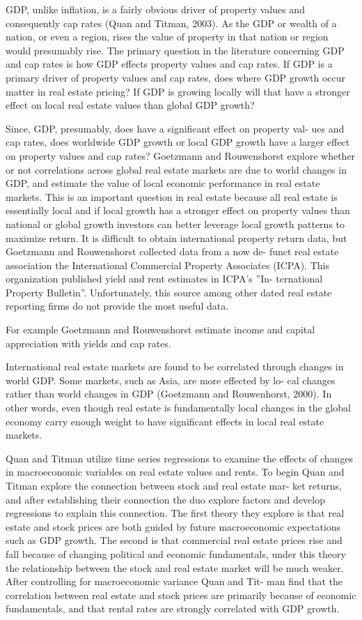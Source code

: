 GDP, unlike inflation, is a fairly obvious driver of property values and consequently cap rates (Quan and Titman, 2003). As the GDP or wealth of a nation, or even a region, rises the value of property in that nation or region would presumably rise. The primary question in the literature concerning GDP and cap rates is how GDP effects property values and cap rates. If GDP is a primary driver of property values and cap rates, does where GDP growth occur matter in real estate pricing? If GDP is growing locally will that have a stronger effect on local real estate values than global GDP growth?

Since, GDP, presumably, does have a significant effect on property val- ues and cap rates, does worldwide GDP growth or local GDP growth have a larger effect on property values and cap rates? Goetzmann and Rouwenshorst explore whether or not correlations across global real estate markets are due to world changes in GDP, and estimate the value of local economic performance in real estate markets. This is an important question in real estate because all real estate is essentially local and if local growth has a stronger effect on property values than national or global growth investors can better leverage local growth patterns to maximize return. It is difficult to obtain international property return data, but Goetzmann and Rouwenshorst collected data from a now de- funct real estate association the International Commercial Property Associates (ICPA). This organization published yield and rent estimates in ICPA’s ”In- ternational Property Bulletin”. Unfortunately, this source among other dated real estate reporting firms do not provide the most useful data. 

For example Goetzmann and Rouwenshorst estimate income and capital appreciation with yields and cap rates.

International real estate markets are found to be correlated through changes in world GDP. Some markets, such as Asia, are more effected by lo- cal changes rather than world changes in GDP (Goetzmann and Rouwenhorst, 2000). In other words, even though real estate is fundamentally local changes in the global economy carry enough weight to have significant effects in local real estate markets.

Quan and Titman utilize time series regressions to examine the effects of changes in macroeconomic variables on real estate values and rents. To begin Quan and Titman explore the connection between stock and real estate mar- ket returns, and after establishing their connection the duo explore factors and develop regressions to explain this connection. The first theory they explore is that real estate and stock prices are both guided by future macroeconomic expectations such as GDP growth. The second is that commercial real estate prices rise and fall because of changing political and economic fundamentals, under this theory the relationship between the stock and real estate market will be much weaker. After controlling for macroeconomic variance Quan and Tit- man find that the correlation between real estate and stock prices are primarily because of economic fundamentals, and that rental rates are strongly correlated with GDP growth.

